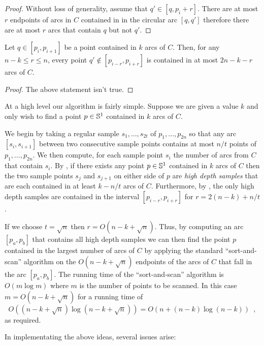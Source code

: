 \documentclass[charterfonts,lotsofwhite]{patmorin}
\begin{document}
\begin{proof}
Without loss of generality, assume that $q'\in[q,p_i+r]$.  There are
at most $r$ endpoints of arcs in $C$ contained in in the circular arc
$[q,q']$ therefore there are at most $r$ arcs that contain $q$ but not
$q'$.
\end{proof}

\begin{lem}
Let $q\in[p_i,p_{i+1}]$ be a point contained in $k$ arcs of $C$.
Then, for any $n-k \le r\le n$, every point $q'\notin[p_{i-r},p_{i+r}]$ 
is contained in at most $2n-k-r$ arcs of $C$.
\end{lem}

\begin{proof}
The above statement isn't true.
\end{proof}

At a high level our algorithm is fairly simple.  Suppose we are given
a value $k$ and only wish to find a point $p\in\mathbb{S}^1$
contained in $k$ arcs of $C$.

We begin by taking a regular sample $s_1,\ldots,s_{2t}$ of
$p_1,\ldots,p_{2n}$ so that any arc $[s_i,s_{i+1}]$ between two
consecutive sample points contains at most $n/t$ points of
$p_1,\ldots,p_{2n}$.  We then compute, for each sample point $s_i$ the
number of arcs from $C$ that contain $s_i$.  By , if
there exists any point $p\in \mathbb{S}^1$ contained in $k$ arcs of $C$
then the two sample points $s_j$ and $s_{j+1}$ on either side of $p$
are \emph{high depth samples} that are each contained in at least
$k-n/t$ arcs of $C$.  Furthermore, by , the only high
depth samples are contained in the interval $[p_{i-r},p_{i+r}]$ for
$r=2(n-k)+n/t$.  

If we choose $t=\sqrt{n}$ then $r=O(n-k+\sqrt{n})$.  Thus, by
computing an arc $[p_a,p_b]$ that contains all high depth samples we
can then find the point $p$ contained in the largest number of arcs of
$C$ by applying the standard ``sort-and-scan'' algorithm on the
$O(n-k+\sqrt{n})$ endpoints of the arcs of $C$ that fall in the arc 
$[p_a,p_b]$.  The running
time of the ``sort-and-scan'' algorithm is $O(m\log m)$ where $m$ is
the number of points to be scanned.  In this case $m=O(n-k+\sqrt{n})$
for a running time of 
\[
   O((n-k+\sqrt{n})\log(n-k+\sqrt n)) = O(n + (n-k)\log (n-k)) \enspace ,
\]
as required.

In implementating the above ideas, several issues
arise:
\end{document}
